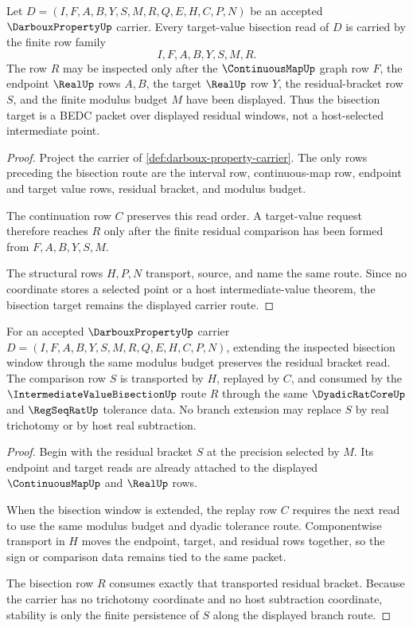 \begin{theorem}
\label{thm:darboux-property-bisection-target-carrier}
Let $D=(I,F,A,B,Y,S,M,R,Q,E,H,C,P,N)$ be an accepted $\DarbouxPropertyUp$ carrier. Every target-value bisection read of $D$ is carried by the finite row family
$$
I,F,A,B,Y,S,M,R .
$$
The row $R$ may be inspected only after the $\ContinuousMapUp$ graph row $F$, the endpoint $\RealUp$ rows $A,B$, the target $\RealUp$ row $Y$, the residual-bracket row $S$, and the finite modulus budget $M$ have been displayed. Thus the bisection target is a BEDC packet over displayed residual windows, not a host-selected intermediate point.
\end{theorem}
\begin{proof}
Project the carrier of \autoref{def:darboux-property-carrier}. The only rows preceding the bisection route are the interval row, continuous-map row, endpoint and target value rows, residual bracket, and modulus budget.

The continuation row $C$ preserves this read order. A target-value request therefore reaches $R$ only after the finite residual comparison has been formed from $F,A,B,Y,S,M$.

The structural rows $H,P,N$ transport, source, and name the same route. Since no coordinate stores a selected point or a host intermediate-value theorem, the bisection target remains the displayed carrier route.
\end{proof}

\begin{theorem}
\label{thm:darboux-property-residual-bracket-stability}
For an accepted $\DarbouxPropertyUp$ carrier $D=(I,F,A,B,Y,S,M,R,Q,E,H,C,P,N)$, extending the inspected bisection window through the same modulus budget preserves the residual bracket read. The comparison row $S$ is transported by $H$, replayed by $C$, and consumed by the $\IntermediateValueBisectionUp$ route $R$ through the same $\DyadicRatCoreUp$ and $\RegSeqRatUp$ tolerance data. No branch extension may replace $S$ by real trichotomy or by host real subtraction.
\end{theorem}
\begin{proof}
Begin with the residual bracket $S$ at the precision selected by $M$. Its endpoint and target reads are already attached to the displayed $\ContinuousMapUp$ and $\RealUp$ rows.

When the bisection window is extended, the replay row $C$ requires the next read to use the same modulus budget and dyadic tolerance route. Componentwise transport in $H$ moves the endpoint, target, and residual rows together, so the sign or comparison data remains tied to the same packet.

The bisection row $R$ consumes exactly that transported residual bracket. Because the carrier has no trichotomy coordinate and no host subtraction coordinate, stability is only the finite persistence of $S$ along the displayed branch route.
\end{proof}

